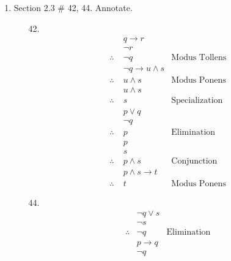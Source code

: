 \documentclass[12pt]{article}
\begin{document}
\begin{enumerate}
            
        \item Section 2.3 \# 42, 44. Annotate.
            \begin{enumerate}
                \item[42.]
                    \begin{align*}
                                    & q \rightarrow r \\
                                    & \neg r\\
                        \therefore \;  & \neg q                        & \text{Modus Tollens}\\
                                    &\neg q \rightarrow u \wedge s \\
                        \therefore \;  & u \wedge s                    & \text{Modus Ponens}\\
                                    & u \wedge s\\
                        \therefore  \; & s                             & \text{Specialization}\\
                                    & p \vee q\\
                                    & \neg q\\
                        \therefore \; & p                             & \text{Elimination}\\
                                    & p\\
                                    & s\\
                        \therefore  & p\wedge s                       & \text{Conjunction}\\
                                    & p \wedge s \rightarrow t\\
                        \therefore \; & t                             & \text{Modus Ponens}
                    \end{align*}
                \item[44.]
                    \begin{align*}
                                    & \neg q \vee s\\
                                    & \neg s\\
                        \therefore  & \neg q                          & \text{Elimination}\\
                                    & p \rightarrow q\\
                                    & \neg q\\

\end{align*}
\end{enumerate}
\end{enumerate}
\end{document}
